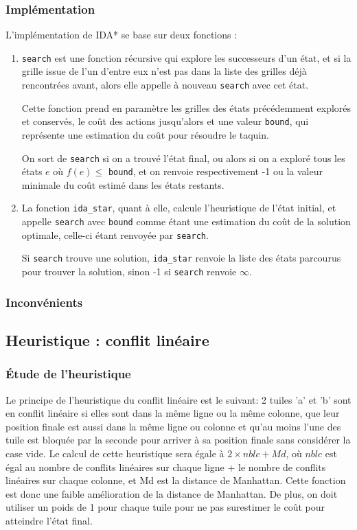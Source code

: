 \documentclass[a4paper, 12pt]{article}
\begin{document}
\subsubsection{Implémentation}

L'implémentation de IDA* se base sur deux fonctions :
\begin{enumerate}
    \item \lstinline{search} est une fonction récursive qui explore les successeurs d'un état, et si la grille issue de l'un d'entre eux n'est pas dans la liste des grilles déjà rencontrées avant, alors elle appelle à nouveau \lstinline{search} avec cet état.

          Cette fonction prend en paramètre les grilles des états précédemment explorés et conservés, le coût des actions jusqu'alors et une valeur \lstinline{bound}, qui représente une estimation du coût pour résoudre le taquin.

          On sort de \lstinline{search} si on a trouvé l'état final, ou alors si on a exploré tous les états $e$ où $f(e) \leq $ \lstinline{bound}, et on renvoie respectivement -1 ou la valeur minimale du coût estimé dans les états restants.

    \item La fonction \lstinline{ida_star}, quant à elle, calcule l'heuristique de l'état initial, et appelle \lstinline{search} avec \lstinline{bound} comme étant une estimation du coût de la solution optimale, celle-ci étant renvoyée par \lstinline{search}.

          Si \lstinline{search} trouve une solution, \lstinline{ida_star} renvoie la liste des états parcourus pour trouver la solution, sinon -1 si \lstinline{search} renvoie $\infty$.
\end{enumerate}

\subsubsection{Inconvénients}

\subsection{Heuristique : conflit linéaire}


\subsubsection{Étude de l'heuristique}

Le principe de l'heuristique du conflit linéaire est le suivant: 2 tuiles 'a' et 'b' sont en conflit linéaire si elles sont dans la même ligne ou la même colonne, que leur position finale est aussi dans la même ligne ou colonne et qu'au moins l'une des tuile est bloquée par la seconde pour arriver à sa position finale sans considérer la case vide.
Le calcul de cette heuristique sera égale à $2 \times nblc + Md$, où $nblc$ est égal au nombre de conflits linéaires sur chaque ligne + le nombre de conflits linéaires sur chaque colonne, et Md est la distance de Manhattan. Cette fonction est donc une faible amélioration de la distance de Manhattan. De plus, on doit utiliser un poids de 1 pour chaque tuile pour ne pas surestimer le coût pour atteindre l'état final.
\end{document}
